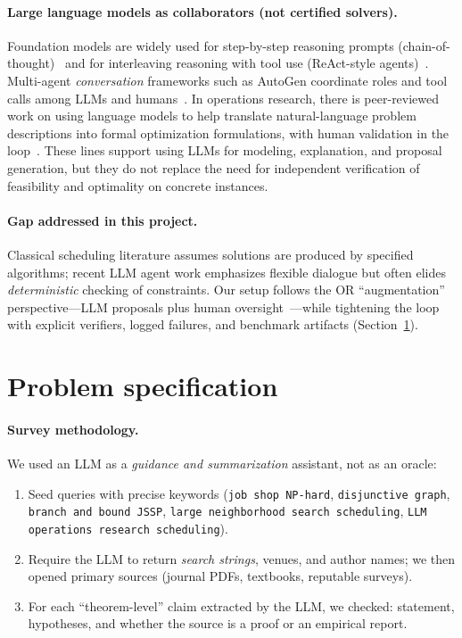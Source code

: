 \documentclass[11pt]{article}
\begin{document}
\paragraph{Large language models as collaborators (not certified solvers).}
Foundation models are widely used for step-by-step reasoning prompts (chain-of-thought)~\cite{Wei2022} and for interleaving reasoning with tool use (ReAct-style agents)~\cite{Yao2023}.
Multi-agent \emph{conversation} frameworks such as AutoGen coordinate roles and tool calls among LLMs and humans~\cite{Wu2024}.
In operations research, there is peer-reviewed work on using language models to help translate natural-language problem descriptions into formal optimization formulations, with human validation in the loop~\cite{Ramamonjison2022}.
These lines support using LLMs for modeling, explanation, and proposal generation, but they do not replace the need for independent verification of feasibility and optimality on concrete instances.

\paragraph{Gap addressed in this project.}
Classical scheduling literature assumes solutions are produced by specified algorithms; recent LLM agent work emphasizes flexible dialogue but often elides \emph{deterministic} checking of constraints.
Our setup follows the OR ``augmentation'' perspective---LLM proposals plus human oversight~\cite{Ramamonjison2022}---while tightening the loop with explicit verifiers, logged failures, and benchmark artifacts (Section~\ref{sec:problem-spec}).

\section{Problem specification}
\label{sec:problem-spec}

\paragraph{Survey methodology.} We used an LLM as a \emph{guidance and summarization} assistant, not as an oracle:
\begin{enumerate}[noitemsep]
  \item Seed queries with precise keywords (\texttt{job shop NP-hard}, \texttt{disjunctive graph}, \texttt{branch and bound JSSP}, \texttt{large neighborhood search scheduling}, \texttt{LLM operations research scheduling}).
  \item Require the LLM to return \emph{search strings}, venues, and author names; we then opened primary sources (journal PDFs, textbooks, reputable surveys).
  \item For each ``theorem-level'' claim extracted by the LLM, we checked: statement, hypotheses, and whether the source is a proof or an empirical report.
\end{enumerate}
\end{document}
